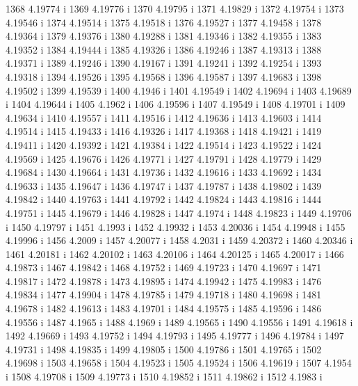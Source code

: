  1368  4.19774  i
 1369  4.19776  i
 1370  4.19795  i
 1371  4.19829  i
 1372  4.19754  i
 1373  4.19546  i
 1374  4.19514  i
 1375  4.19518  i
 1376  4.19527  i
 1377  4.19458  i
 1378  4.19364  i
 1379  4.19376  i
 1380  4.19288  i
 1381  4.19346  i
 1382  4.19355  i
 1383  4.19352  i
 1384  4.19444  i
 1385  4.19326  i
 1386  4.19246  i
 1387  4.19313  i
 1388  4.19371  i
 1389  4.19246  i
 1390  4.19167  i
 1391  4.19241  i
 1392  4.19254  i
 1393  4.19318  i
 1394  4.19526  i
 1395  4.19568  i
 1396  4.19587  i
 1397  4.19683  i
 1398  4.19502  i
 1399  4.19539  i
 1400  4.1946  i
 1401  4.19549  i
 1402  4.19694  i
 1403  4.19689  i
 1404  4.19644  i
 1405  4.1962  i
 1406  4.19596  i
 1407  4.19549  i
 1408  4.19701  i
 1409  4.19634  i
 1410  4.19557  i
 1411  4.19516  i
 1412  4.19636  i
 1413  4.19603  i
 1414  4.19514  i
 1415  4.19433  i
 1416  4.19326  i
 1417  4.19368  i
 1418  4.19421  i
 1419  4.19411  i
 1420  4.19392  i
 1421  4.19384  i
 1422  4.19514  i
 1423  4.19522  i
 1424  4.19569  i
 1425  4.19676  i
 1426  4.19771  i
 1427  4.19791  i
 1428  4.19779  i
 1429  4.19684  i
 1430  4.19664  i
 1431  4.19736  i
 1432  4.19616  i
 1433  4.19692  i
 1434  4.19633  i
 1435  4.19647  i
 1436  4.19747  i
 1437  4.19787  i
 1438  4.19802  i
 1439  4.19842  i
 1440  4.19763  i
 1441  4.19792  i
 1442  4.19824  i
 1443  4.19816  i
 1444  4.19751  i
 1445  4.19679  i
 1446  4.19828  i
 1447  4.1974  i
 1448  4.19823  i
 1449  4.19706  i
 1450  4.19797  i
 1451  4.1993  i
 1452  4.19932  i
 1453  4.20036  i
 1454  4.19948  i
 1455  4.19996  i
 1456  4.2009  i
 1457  4.20077  i
 1458  4.2031  i
 1459  4.20372  i
 1460  4.20346  i
 1461  4.20181  i
 1462  4.20102  i
 1463  4.20106  i
 1464  4.20125  i
 1465  4.20017  i
 1466  4.19873  i
 1467  4.19842  i
 1468  4.19752  i
 1469  4.19723  i
 1470  4.19697  i
 1471  4.19817  i
 1472  4.19878  i
 1473  4.19895  i
 1474  4.19942  i
 1475  4.19983  i
 1476  4.19834  i
 1477  4.19904  i
 1478  4.19785  i
 1479  4.19718  i
 1480  4.19698  i
 1481  4.19678  i
 1482  4.19613  i
 1483  4.19701  i
 1484  4.19575  i
 1485  4.19596  i
 1486  4.19556  i
 1487  4.1965  i
 1488  4.1969  i
 1489  4.19565  i
 1490  4.19556  i
 1491  4.19618  i
 1492  4.19669  i
 1493  4.19752  i
 1494  4.19793  i
 1495  4.19777  i
 1496  4.19784  i
 1497  4.19731  i
 1498  4.19835  i
 1499  4.19805  i
 1500  4.19786  i
 1501  4.19765  i
 1502  4.19698  i
 1503  4.19658  i
 1504  4.19523  i
 1505  4.19524  i
 1506  4.19619  i
 1507  4.1954  i
 1508  4.19708  i
 1509  4.19773  i
 1510  4.19852  i
 1511  4.19862  i
 1512  4.1983  i
